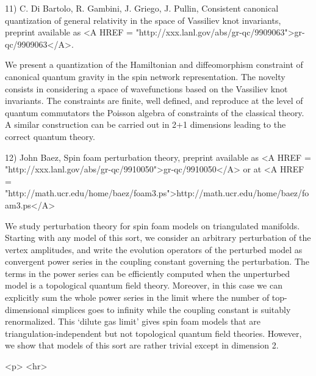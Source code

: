 11) C. Di Bartolo, R. Gambini, J. Griego, J. Pullin, Consistent
canonical quantization of general relativity in the space of
Vassiliev knot invariants, preprint available as <A HREF = "http://xxx.lanl.gov/abs/gr-qc/9909063">gr-qc/9909063</A>.  

We present a quantization of the Hamiltonian and diffeomorphism
constraint of canonical quantum gravity in the spin network
representation.  The novelty consists in considering a space of
wavefunctions based on the Vassiliev knot invariants.  The constraints
are finite, well defined, and reproduce at the level of quantum
commutators the Poisson algebra of constraints of the classical theory.
A similar construction can be carried out in 2+1 dimensions leading to
the correct quantum theory.

12) John Baez, Spin foam perturbation theory, preprint available as 
<A HREF = "http://xxx.lanl.gov/abs/gr-qc/9910050">gr-qc/9910050</A> or at 
<A HREF = "http://math.ucr.edu/home/baez/foam3.ps">http://math.ucr.edu/home/baez/foam3.ps</A>

We study perturbation theory for spin foam models on triangulated
manifolds.  Starting with any model of this sort, we consider an
arbitrary perturbation of the vertex amplitudes, and write the 
evolution operators of the perturbed model as convergent power series in
the coupling constant governing the perturbation.   The terms in the
power series can be efficiently computed when the unperturbed model is a
topological quantum field theory.  Moreover, in this case we can
explicitly sum the whole power series in the limit where the number  of
top-dimensional simplices goes to infinity while the coupling constant
is suitably renormalized.  This `dilute gas limit' gives spin foam
models that are triangulation-independent but not topological quantum
field theories.  However, we show that models of this sort are rather
trivial except in dimension 2.
 





<p> <hr>



